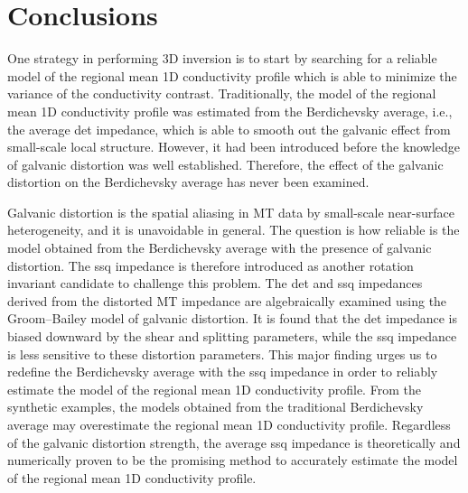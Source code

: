 
\renewcommand{\thisdir}{_content/conclusions}
\renewcommand{\figdir}{\thisdir/_fig}
\chapter[Conclusions]{Conclusions}

	One strategy in performing 3D inversion is to start by searching for a reliable model of the regional mean 1D conductivity profile which is able to minimize the variance of the conductivity contrast. 
	Traditionally, the model of the regional mean 1D conductivity profile was estimated from the Berdichevsky average, i.e., the average det impedance, which is able to smooth out the galvanic effect from small-scale local structure. However, it had been introduced before the knowledge of galvanic distortion was well established. Therefore, the effect of the galvanic distortion on the Berdichevsky average has never been examined.

	Galvanic distortion is the spatial aliasing in MT data by small-scale near-surface heterogeneity, and it is unavoidable in general.
	The question is how reliable is the model obtained from the Berdichevsky average with the presence of galvanic distortion.
	The ssq impedance is therefore introduced as another rotation invariant candidate to challenge this problem.
	The det and ssq impedances derived from the distorted MT impedance are algebraically examined using the Groom--Bailey model of galvanic distortion.
	It is found that the det impedance is biased downward by the shear and splitting parameters, while the ssq impedance is less sensitive to these distortion parameters.
	This major finding urges us to redefine the Berdichevsky average with the ssq impedance in order to reliably estimate the model of the regional mean 1D conductivity profile.
	From the synthetic examples, the models obtained from the traditional Berdichevsky average may overestimate the regional mean 1D conductivity profile.
 Regardless of the galvanic distortion strength, the average ssq impedance is theoretically and numerically proven to be the promising method to accurately estimate the model of the regional mean 1D conductivity profile.

